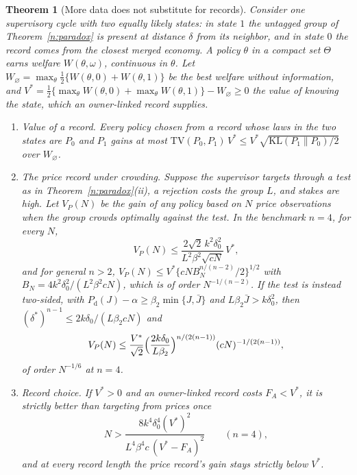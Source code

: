 \documentclass[11pt,letterpaper]{article}
\newtheorem{theorem}{Theorem}[section]
\theoremstyle{definition}
\newcommand{\KL}{\mathrm{KL}}
\newcommand{\TV}{\mathrm{TV}}
\begin{document}
\begin{theorem}[More data does not substitute for records]\label{n:recordvalue}
Consider one supervisory cycle with two equally likely states: in state $1$ the untagged group of Theorem~\ref{n:paradox} is present at distance $\delta$ from its neighbor, and in state $0$ the record comes from the closest merged economy. A policy $\theta$ in a compact set $\Theta$ earns welfare $W(\theta, \omega)$, continuous in $\theta$. Let $W_\varnothing = \max_\theta \tfrac12\{W(\theta, 0) + W(\theta, 1)\}$ be the best welfare without information, and $V^* = \tfrac12\{\max_\theta W(\theta, 0) + \max_\theta W(\theta, 1)\} - W_\varnothing \ge 0$ the value of knowing the state, which an owner-linked record supplies.
\begin{enumerate}
  \item[(i)] \emph{Value of a record.} Every policy chosen from a record whose laws in the two states are $P_0$ and $P_1$ gains at most $\TV(P_0, P_1)\, V^* \le V^* \sqrt{\KL(P_1 \| P_0)/2}$ over $W_\varnothing$.
  \item[(ii)] \emph{The price record under crowding.} Suppose the supervisor targets through a test as in Theorem~\ref{n:paradox}(ii), a rejection costs the group $L$, and stakes are high. Let $V_P(N)$ be the gain of any policy based on $N$ price observations when the group crowds optimally against the test. In the benchmark $n = 4$, for every $N$,
  \[
    V_P(N) \le \frac{2\sqrt{2}\, k^2 \delta_0^2}{L^2 \beta^2 \sqrt{cN}}\, V^*,
  \]
  and for general $n > 2$, $V_P(N) \le V^* \{c N B_N^{n/(n-2)}/2\}^{1/2}$ with $B_N = 4k^2\delta_0^2/(L^2\beta^2 cN)$, which is of order $N^{-1/(n-2)}$. If the test is instead two-sided, with $P_{\mathrm{d}}(J) - \alpha \ge \beta_2 \min\{J, \bar J\}$ and $L\beta_2 \bar J > k\delta_0^2$, then $(\delta^*)^{n-1} \le 2k\delta_0/(L\beta_2 cN)$ and
  \[
    V_P(N) \le \frac{V^*}{\sqrt 2}\Bigl(\frac{2k\delta_0}{L\beta_2}\Bigr)^{n/(2(n-1))} (cN)^{-1/(2(n-1))},
  \]
  of order $N^{-1/6}$ at $n = 4$.
  \item[(iii)] \emph{Record choice.} If $V^* > 0$ and an owner-linked record costs $F_A < V^*$, it is strictly better than targeting from prices once
  \[
    N > \frac{8 k^4 \delta_0^4 (V^*)^2}{L^4 \beta^4 c\, (V^* - F_A)^2} \qquad (n = 4),
  \]
  and at every record length the price record's gain stays strictly below $V^*$.
\end{enumerate}
\end{theorem}
\end{document}
